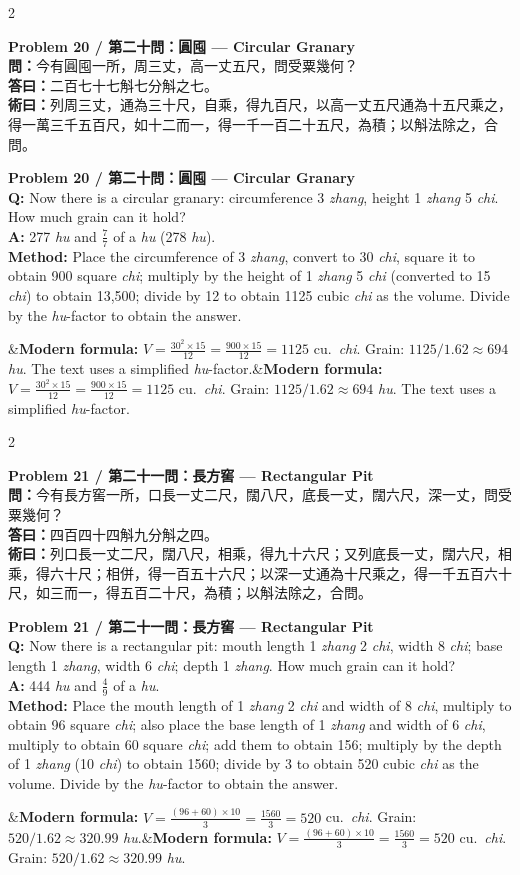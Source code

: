 \documentclass[11pt,a4paper]{article}
\newcommand{\bilingualproblem}[4]{%
  \begin{paracol}{2}
  \begin{leftcolumn}
  \noindent\textbf{\color{problemcolor}#1}\\[0.2cm]
  #2
  \end{leftcolumn}
  \switchcolumn
  \noindent\textbf{\color{problemcolor}#1}\\[0.2cm]
  #3
  \end{paracol}
  \ifx&#4&\else\vspace{0.3cm}\noindent#4\fi
  \vspace{0.5cm}
}
\newcommand{\wen}[1]{\textcolor{problemcolor}{\textbf{問：}}#1}
\newcommand{\da}[1]{\textcolor{answercolor}{\textbf{答曰：}}#1}
\newcommand{\shu}[1]{\textcolor{methodcolor}{\textbf{術曰：}}#1}
\newcommand{\wenen}[1]{\textcolor{problemcolor}{\textbf{Q:}} #1}
\newcommand{\daen}[1]{\textcolor{answercolor}{\textbf{A:}} #1}
\newcommand{\shuen}[1]{\textcolor{methodcolor}{\textbf{Method:}} #1}
\begin{document}
\bilingualproblem{Problem 20 / 第二十問：圓囤 --- Circular Granary}{
\wen{今有圓囤一所，周三丈，高一丈五尺，問受粟幾何？}\\[0.2cm]
\da{二百七十七斛七分斛之七。}\\[0.2cm]
\shu{列周三丈，通為三十尺，自乘，得九百尺，以高一丈五尺通為十五尺乘之，得一萬三千五百尺，如十二而一，得一千一百二十五尺，為積；以斛法除之，合問。}
}{
\wenen{Now there is a circular granary: circumference 3 \textit{zhang}, height 1 \textit{zhang} 5 \textit{chi}. How much grain can it hold?}\\[0.2cm]
\daen{277 \textit{hu} and $\frac{7}{7}$ of a \textit{hu} (278 \textit{hu}).}\\[0.2cm]
\shuen{Place the circumference of 3 \textit{zhang}, convert to 30 \textit{chi}, square it to obtain 900 square \textit{chi}; multiply by the height of 1 \textit{zhang} 5 \textit{chi} (converted to 15 \textit{chi}) to obtain 13,500; divide by 12 to obtain 1125 cubic \textit{chi} as the volume. Divide by the \textit{hu}-factor to obtain the answer.}
}{\textbf{Modern formula:} $V = \frac{30^2 \times 15}{12} = \frac{900 \times 15}{12} = 1125$ cu.\ \textit{chi}. Grain: $1125 / 1.62 \approx 694$ \textit{hu}. The text uses a simplified \textit{hu}-factor.}

\bilingualproblem{Problem 21 / 第二十一問：長方窖 --- Rectangular Pit}{
\wen{今有長方窖一所，口長一丈二尺，闊八尺，底長一丈，闊六尺，深一丈，問受粟幾何？}\\[0.2cm]
\da{四百四十四斛九分斛之四。}\\[0.2cm]
\shu{列口長一丈二尺，闊八尺，相乘，得九十六尺；又列底長一丈，闊六尺，相乘，得六十尺；相併，得一百五十六尺；以深一丈通為十尺乘之，得一千五百六十尺，如三而一，得五百二十尺，為積；以斛法除之，合問。}
}{
\wenen{Now there is a rectangular pit: mouth length 1 \textit{zhang} 2 \textit{chi}, width 8 \textit{chi}; base length 1 \textit{zhang}, width 6 \textit{chi}; depth 1 \textit{zhang}. How much grain can it hold?}\\[0.2cm]
\daen{444 \textit{hu} and $\frac{4}{9}$ of a \textit{hu}.}\\[0.2cm]
\shuen{Place the mouth length of 1 \textit{zhang} 2 \textit{chi} and width of 8 \textit{chi}, multiply to obtain 96 square \textit{chi}; also place the base length of 1 \textit{zhang} and width of 6 \textit{chi}, multiply to obtain 60 square \textit{chi}; add them to obtain 156; multiply by the depth of 1 \textit{zhang} (10 \textit{chi}) to obtain 1560; divide by 3 to obtain 520 cubic \textit{chi} as the volume. Divide by the \textit{hu}-factor to obtain the answer.}
}{\textbf{Modern formula:} $V = \frac{(96 + 60) \times 10}{3} = \frac{1560}{3} = 520$ cu.\ \textit{chi}. Grain: $520 / 1.62 \approx 320.99$ \textit{hu}.}
\end{document}
